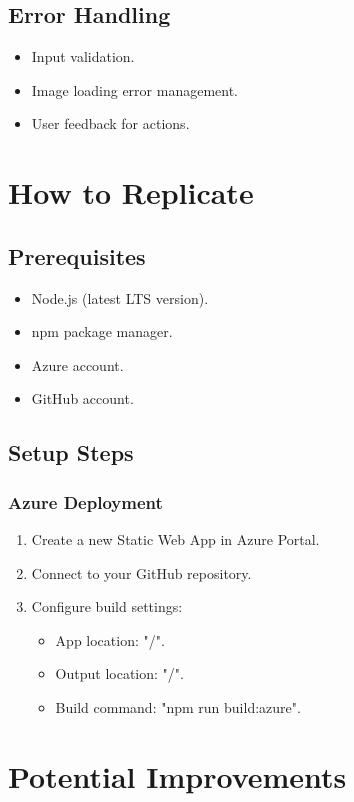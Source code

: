 \documentclass[12pt]{article}
\begin{document}
\subsection{Error Handling}
\begin{itemize}
    \item Input validation.
    \item Image loading error management.
    \item User feedback for actions.
\end{itemize}

\section{How to Replicate}
\subsection{Prerequisites}
\begin{itemize}
    \item Node.js (latest LTS version).
    \item npm package manager.
    \item Azure account.
    \item GitHub account.
\end{itemize}

\subsection{Setup Steps}
\subsubsection{Azure Deployment}
\begin{enumerate}
    \item Create a new Static Web App in Azure Portal.
    \item Connect to your GitHub repository.
    \item Configure build settings:
    \begin{itemize}
        \item App location: "/".
        \item Output location: "/".
        \item Build command: "npm run build:azure".
    \end{itemize}
\end{enumerate}

\section{Potential Improvements}
\end{document}
